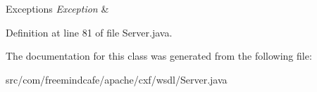 \begin{DoxyExceptions}{Exceptions}
{\em Exception} & \\
\hline
\end{DoxyExceptions}


Definition at line 81 of file Server.\+java.



The documentation for this class was generated from the following file\+:\begin{DoxyCompactItemize}
\item 
src/com/freemindcafe/apache/cxf/wsdl/Server.\+java\end{DoxyCompactItemize}
